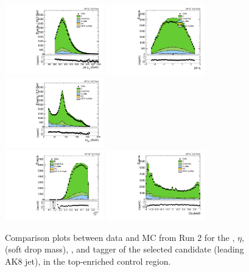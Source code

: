 \begin{figure}[htbp]
  \centering
  \includegraphics[width=0.3825\textwidth]{fig/controlPlots/CR_b1_allL_allP_allC_allD_Run2_lnujj_l2_pt.pdf}
  \includegraphics[width=0.3825\textwidth]{fig/controlPlots/CR_b1_allL_allP_allC_allD_Run2_lnujj_l2_eta.pdf}\\
  \includegraphics[width=0.3825\textwidth]{fig/controlPlots/CR_b1_allL_allP_allC_allD_Run2_mjet.pdf}\\
  \includegraphics[width=0.3825\textwidth]{fig/controlPlots/CR_b1_allL_allP_allC_allD_Run2_tau21DDT.pdf}
  \includegraphics[width=0.3825\textwidth]{fig/controlPlots/CR_b1_allL_allP_allC_allD_Run2_DoubleB.pdf}\\
  \caption{
    Comparison plots between data and MC from Run 2 for the \pt, $\eta$, \MJ (soft drop mass), \nsubjDDT, and \DoubleB tagger of the selected \Vhad candidate (leading AK8 jet), in the top-enriched control region.
  }
  \label{fig:CR_controlPlotsRun2_3}
\end{figure}

